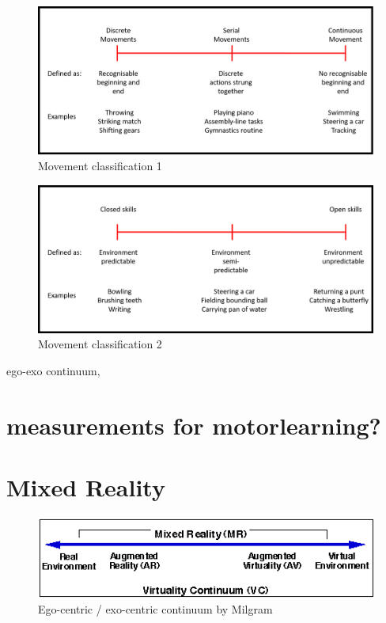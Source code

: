 \begin{figure}[htb]
	\centering
	\includegraphics[width=\textwidth]{figures/movement_classification.png}
	\caption[Movement classification 1]{Movement classification 1}
	\label{fig:movement_classification}
\end{figure}

\begin{figure}[htb]
	\centering
	\includegraphics[width=\textwidth]{figures/movement_classification2.png}
	\caption[Movement classification 2]{Movement classification 2}
	\label{fig:movement_classification2}
\end{figure}

ego-exo continuum,
\section{measurements for motorlearning?}
\section{Mixed Reality}
\begin{figure}[htb]
	\centering
	\includegraphics[width=\textwidth]{figures/milgram_continuum.png}
	\caption[Ego-Exo continuum by Milgram]{Ego-centric / exo-centric continuum by Milgram }
	\label{fig:mr_continuum}
\end{figure}


